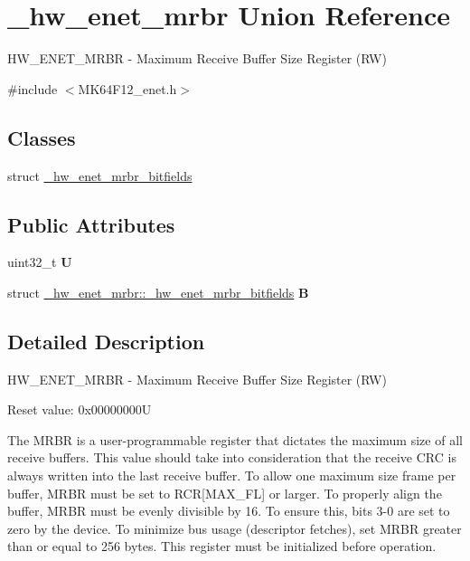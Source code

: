 \hypertarget{union__hw__enet__mrbr}{}\section{\+\_\+hw\+\_\+enet\+\_\+mrbr Union Reference}
\label{union__hw__enet__mrbr}


H\+W\+\_\+\+E\+N\+E\+T\+\_\+\+M\+R\+BR -\/ Maximum Receive Buffer Size Register (RW)  




{\ttfamily \#include $<$M\+K64\+F12\+\_\+enet.\+h$>$}

\subsection*{Classes}
\begin{DoxyCompactItemize}
\item 
struct \hyperlink{struct__hw__enet__mrbr_1_1__hw__enet__mrbr__bitfields}{\+\_\+hw\+\_\+enet\+\_\+mrbr\+\_\+bitfields}
\end{DoxyCompactItemize}
\subsection*{Public Attributes}
\begin{DoxyCompactItemize}
\item 
uint32\+\_\+t {\bfseries U}\hypertarget{union__hw__enet__mrbr_ac1fa94bf4c83448dd54261a831030fd3}{}\label{union__hw__enet__mrbr_ac1fa94bf4c83448dd54261a831030fd3}

\item 
struct \hyperlink{struct__hw__enet__mrbr_1_1__hw__enet__mrbr__bitfields}{\+\_\+hw\+\_\+enet\+\_\+mrbr\+::\+\_\+hw\+\_\+enet\+\_\+mrbr\+\_\+bitfields} {\bfseries B}\hypertarget{union__hw__enet__mrbr_acbd0c2eb7399bed979d12899d4fd6de8}{}\label{union__hw__enet__mrbr_acbd0c2eb7399bed979d12899d4fd6de8}

\end{DoxyCompactItemize}


\subsection{Detailed Description}
H\+W\+\_\+\+E\+N\+E\+T\+\_\+\+M\+R\+BR -\/ Maximum Receive Buffer Size Register (RW) 

Reset value\+: 0x00000000U

The M\+R\+BR is a user-\/programmable register that dictates the maximum size of all receive buffers. This value should take into consideration that the receive C\+RC is always written into the last receive buffer. To allow one maximum size frame per buffer, M\+R\+BR must be set to R\+CR\mbox{[}M\+A\+X\+\_\+\+FL\mbox{]} or larger. To properly align the buffer, M\+R\+BR must be evenly divisible by 16. To ensure this, bits 3-\/0 are set to zero by the device. To minimize bus usage (descriptor fetches), set M\+R\+BR greater than or equal to 256 bytes. This register must be initialized before operation. 

